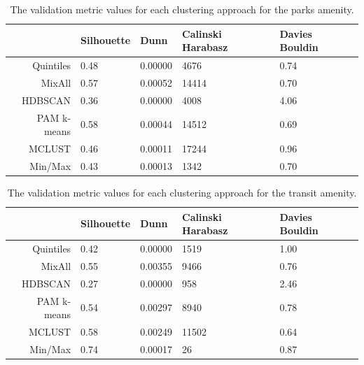 \documentclass[11pt, a4paper]{article}
\begin{document}
\centering
\begin{longtable}[h]{|r|llll|}
\caption[Parks validation metrics]{The validation metric values for each clustering approach for the parks amenity.}\label{parksvalid}
\endfirsthead
\endhead
  \hline
 & Silhouette & Dunn & Calinski Harabasz & Davies Bouldin \\
  \hline
Quintiles & 0.48 & 0.00000 &  4676 & 0.74 \\
   \hline
MixAll & 0.57 & \cellcolor{gray!25} 0.00052 & 14414 & 0.70 \\
   \hline
HDBSCAN & 0.36 & 0.00000 &  4008 & 4.06 \\
   \hline
PAM k-means & \cellcolor{gray!25} 0.58 & 0.00044 & 14512 & \cellcolor{gray!25} 0.69 \\
   \hline
MCLUST & 0.46 & 0.00011 & \cellcolor{gray!25} 17244 & 0.96 \\
   \hline
Min/Max & 0.43 & 0.00013 &  1342 & 0.70 \\
   \hline
\end{longtable}









\centering
\begin{longtable}[h]{|r|llll|}
\caption[Transit validation metrics]{The validation metric values for each clustering approach for the transit amenity.}\label{transitvalid}
\endfirsthead
\endhead
  \hline
 & Silhouette & Dunn & Calinski Harabasz & Davies Bouldin \\
  \hline
Quintiles & 0.42 & 0.00000 &  1519 & 1.00 \\
   \hline
MixAll & 0.55 & \cellcolor{gray!25} 0.00355 &  9466 & 0.76 \\
   \hline
HDBSCAN & 0.27 & 0.00000 &   958 & 2.46 \\
   \hline
PAM k-means & 0.54 & 0.00297 &  8940 & 0.78 \\
   \hline
MCLUST & 0.58 & 0.00249 & \cellcolor{gray!25} 11502 & \cellcolor{gray!25} 0.64 \\
   \hline
Min/Max & \cellcolor{gray!25} 0.74 & 0.00017 &    26 & 0.87 \\
   \hline
\end{longtable}
\end{document}
